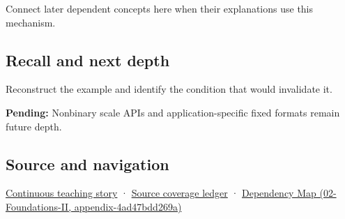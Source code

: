 Connect later dependent concepts here when their explanations use this mechanism.

\subsection{Recall and next depth}\label{recall-and-next-depth}

Reconstruct the example and identify the condition that would invalidate it.

\textbf{Pending:} Nonbinary scale APIs and application-specific fixed formats remain future depth.

\subsection{Source and navigation}\label{source-and-navigation}

\href{Continuous\%20Notes/Computing\%20Foundations\%20-\%20From\%20Bits\%20to\%20C++\%20and\%20Systems\%20APIs\#Choosing\%20what\%20information\%20to\%20keep}{Continuous teaching story} · \hyperref[appendix-fd090d982a15]{Source coverage ledger} · \href{}{Dependency Map (02-Foundations-II, appendix-4ad47bdd269a)}
